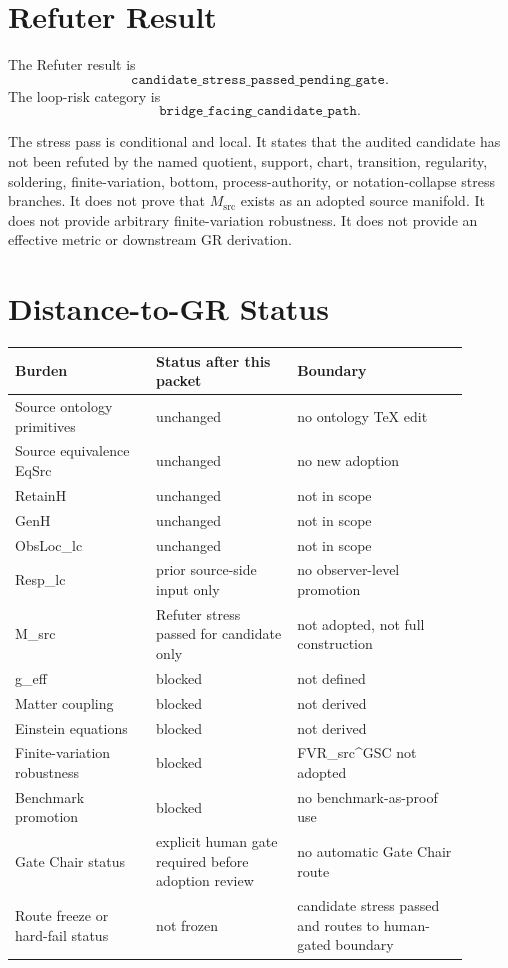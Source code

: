 \documentclass[11pt]{article}
\newcommand{\Msrc}{M_{\mathrm{src}}}
\begin{document}
\section{Refuter Result}

The Refuter result is
\[
  \texttt{candidate\_stress\_passed\_pending\_gate}.
\]
The loop-risk category is
\[
  \texttt{bridge\_facing\_candidate\_path}.
\]

The stress pass is conditional and local. It states that the audited candidate
has not been refuted by the named quotient, support, chart, transition,
regularity, soldering, finite-variation, bottom, process-authority, or
notation-collapse stress branches. It does not prove that \(\Msrc\) exists as
an adopted source manifold. It does not provide arbitrary finite-variation
robustness. It does not provide an effective metric or downstream GR
derivation.

\section{Distance-to-GR Status}

\begin{longtable}{|p{0.28\linewidth}|p{0.28\linewidth}|p{0.34\linewidth}|}
\hline
\textbf{Burden} & \textbf{Status after this packet} & \textbf{Boundary} \\
\hline
Source ontology primitives & unchanged & no ontology TeX edit \\
\hline
Source equivalence EqSrc & unchanged & no new adoption \\
\hline
RetainH & unchanged & not in scope \\
\hline
GenH & unchanged & not in scope \\
\hline
ObsLoc\_lc & unchanged & not in scope \\
\hline
Resp\_lc & prior source-side input only & no observer-level promotion \\
\hline
M\_src & Refuter stress passed for candidate only & not adopted, not full
construction \\
\hline
g\_eff & blocked & not defined \\
\hline
Matter coupling & blocked & not derived \\
\hline
Einstein equations & blocked & not derived \\
\hline
Finite-variation robustness & blocked & FVR\_src\^{}GSC not adopted \\
\hline
Benchmark promotion & blocked & no benchmark-as-proof use \\
\hline
Gate Chair status & explicit human gate required before adoption review &
no automatic Gate Chair route \\
\hline
Route freeze or hard-fail status & not frozen & candidate stress passed and
routes to human-gated boundary \\
\hline
\end{longtable}
\end{document}
